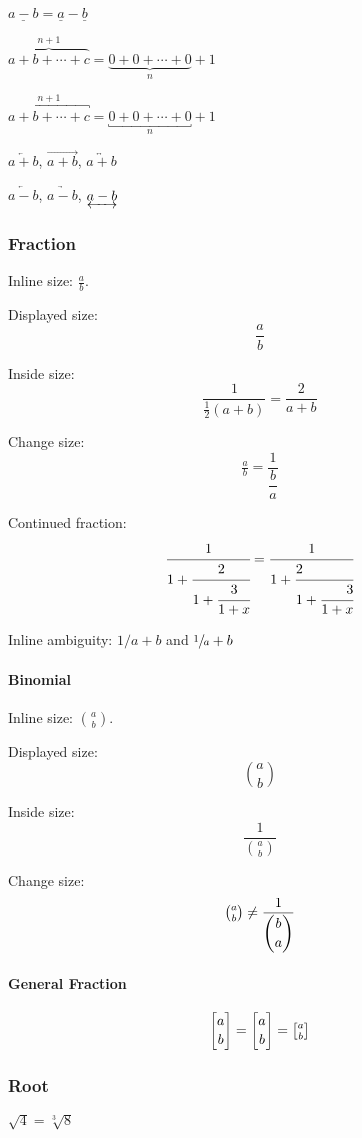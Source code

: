 $ \underline{a - b} = \underline{a} - \underline{b} $

$ \overbrace{a + b + \cdots + c}^{n+1} = \underbrace{0 + 0 + \cdots + 0}_{n} + 1 $

$ \overbracket{a + b + \cdots + c}^{n+1} = \underbracket{0 + 0 + \cdots + 0}_{n} + 1 $      %

$ \overleftarrow{a + b} $, $ \overrightarrow{a + b} $, $ \overleftrightarrow{a + b} $       %

$ \underleftarrow{a - b} $, $ \underrightarrow{a - b} $, $ \underleftrightarrow{a - b} $

\subsubsection{Fraction}
Inline size: $ \frac{a}{b} $.

Displayed size:
\[
    \frac{a}{b}
\]

Inside size:
\[
    \frac{1}{\frac{1}{2}(a + b)} = \frac{2}{a + b}
\]

Change size:
\[
    \tfrac{a}{b} = \frac{1}{\dfrac{b}{a}}   %
\]

Continued fraction:
\[
    \cfrac{1}{1 + \cfrac{2}{1 + \cfrac{3}{1 + x}}} = \cfrac[c]{1}{1 + \cfrac[l]{2}{1 + \cfrac[r]{3}{1 + x}}}    %
\]

Inline ambiguity: $ 1 / a + b $ and $ \sfrac{1}{a} + b $        %

\paragraph{Binomial}
Inline size: $ \binom{a}{b} $.

Displayed size:
\[
    \binom{a}{b}
\]

Inside size:
\[
    \frac{1}{\binom{a}{b}}
\]

Change size:
\[
    \tbinom{a}{b} \neq \frac{1}{\dbinom{b}{a}}
\]

\paragraph{General Fraction}
\[
    \stiring{a}{b} = \dstiring{a}{b} = \tstiring{a}{b}
\]

\subsubsection{Root}
$ \sqrt{4} = \sqrt[3]{8} $

